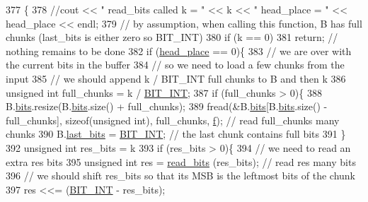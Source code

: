 \begin{DoxyCode}
377                                                    \{
378   \textcolor{comment}{//cout << " read\_bits called k = " << k << " head\_place = " << head\_place << endl;}
379   \textcolor{comment}{// by assumption, when calling this function, B has full chunks (last\_bits is either zero so BIT\_INT)}
380   \textcolor{keywordflow}{if} (k == 0)
381     \textcolor{keywordflow}{return}; \textcolor{comment}{// nothing remains to be done}
382   \textcolor{keywordflow}{if} (\hyperlink{classibitstream_a7b96359ac1534a5565e6e9b0cc53a0b3}{head\_place} == 0)\{
383     \textcolor{comment}{// we are over with the current bits in the buffer}
384     \textcolor{comment}{// so we need to load a few chunks from the input}
385     \textcolor{comment}{// we should append k / BIT\_INT full chunks to B and then k %
386     \textcolor{keywordtype}{unsigned} \textcolor{keywordtype}{int} full\_chunks = k / \hyperlink{bitstream_8h_afcadf5aa65c5159bfb96c4d82ebc0a5d}{BIT\_INT};
387     \textcolor{keywordflow}{if} (full\_chunks > 0)\{
388       B.\hyperlink{classbit__pipe_a86f38af1e9736b053728033490476b50}{bits}.resize(B.\hyperlink{classbit__pipe_a86f38af1e9736b053728033490476b50}{bits}.size() + full\_chunks);
389       fread(&B.\hyperlink{classbit__pipe_a86f38af1e9736b053728033490476b50}{bits}[B.\hyperlink{classbit__pipe_a86f38af1e9736b053728033490476b50}{bits}.size() - full\_chunks], \textcolor{keyword}{sizeof}(\textcolor{keywordtype}{unsigned} int), full\_chunks, 
      \hyperlink{classibitstream_a3ea2cdd0cf97820f0e1520c42e364308}{f}); \textcolor{comment}{// read full\_chunks many chunks}
390       B.\hyperlink{classbit__pipe_a0f3e84b02751803adaab499b5dad86fe}{last\_bits} = \hyperlink{bitstream_8h_afcadf5aa65c5159bfb96c4d82ebc0a5d}{BIT\_INT}; \textcolor{comment}{// the last chunk contains full bits }
391     \}
392     \textcolor{keywordtype}{unsigned} \textcolor{keywordtype}{int} res\_bits = k %
393     \textcolor{keywordflow}{if} (res\_bits > 0)\{
394       \textcolor{comment}{// we need to read an extra res bits}
395       \textcolor{keywordtype}{unsigned} \textcolor{keywordtype}{int} res = \hyperlink{classibitstream_a2fdcaecf10fefa6942dcd5286a2696e0}{read\_bits} (res\_bits); \textcolor{comment}{// read res many bits}
396       \textcolor{comment}{// we should shift res\_bits so that its MSB is the leftmost bits of the chunk}
397       res <<= (\hyperlink{bitstream_8h_afcadf5aa65c5159bfb96c4d82ebc0a5d}{BIT\_INT} - res\_bits);
}
\end{DoxyCode}

